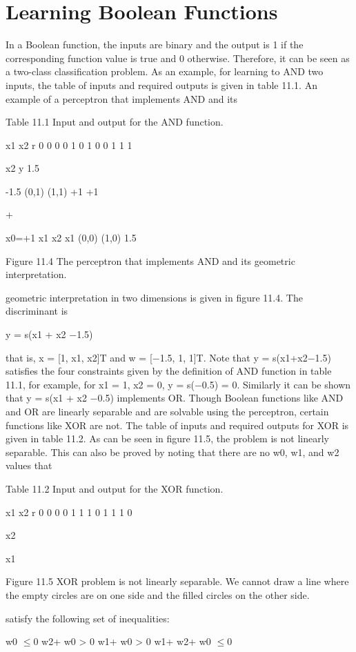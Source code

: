 \section{Learning Boolean Functions}

In a Boolean function, the inputs are binary and the output is 1 if the corresponding function value is true and 0 otherwise. Therefore, it can be seen as a two-class classification problem. As an example, for learning to AND two inputs, the table of inputs and required outputs is given in table 11.1. An example of a perceptron that implements AND and its

Table 11.1 Input and output for the AND function.

x1 x2 r 0 0 0 0 1 0 1 0 0 1 1 1

x2 y 1.5

-1.5 (0,1) (1,1) +1 +1

+

x0=+1 x1 x2 x1 (0,0) (1,0) 1.5

Figure 11.4 The perceptron that implements AND and its geometric interpretation.

geometric interpretation in two dimensions is given in figure 11.4. The discriminant is

y = s(x1 + x2 $-$1.5)

that is, x = [1, x1, x2]T and w = [$-$1.5, 1, 1]T. Note that y = s(x1+x2$-$1.5) satisfies the four constraints given by the definition of AND function in table 11.1, for example, for x1 = 1, x2 = 0, y = s($-$0.5) = 0. Similarly it can be shown that y = s(x1 + x2 $-$0.5) implements OR. Though Boolean functions like AND and OR are linearly separable and are solvable using the perceptron, certain functions like XOR are not. The table of inputs and required outputs for XOR is given in table 11.2. As can be seen in figure 11.5, the problem is not linearly separable. This can also be proved by noting that there are no w0, w1, and w2 values that

Table 11.2 Input and output for the XOR function.

x1 x2 r 0 0 0 0 1 1 1 0 1 1 1 0

x2

x1

Figure 11.5 XOR problem is not linearly separable. We cannot draw a line where the empty circles are on one side and the filled circles on the other side.

satisfy the following set of inequalities:

w0 $\leq$0 w2+ w0 > 0 w1+ w0 > 0 w1+ w2+ w0 $\leq$0

